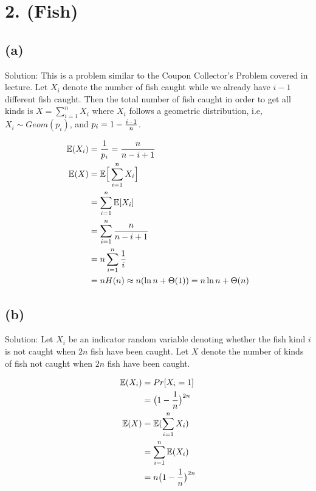 \documentclass[10pt]{537homework}
\author{Peilun Dai}
\begin{document}
\section*{2. (Fish) }


\subsection*{(a)} 

Solution: This is a problem similar to the Coupon Collector's Problem covered in lecture. Let $X_i$ denote the number of fish caught while we already have $i-1$ different fish caught. Then the total number of fish caught in order to get all kinds is $X = \sum_{i=1}^n X_i$ where $X_i$ follows a geometric distribution, i.e, $X_i \sim Geom(p_i)$, and $p_i = 1 - {i-1 \over n}$. 

\begin{align*}
  \mathbb{E}(X_i) & = {1 \over p_i} = {n \over n-i+1} \\
  \mathbb{E}(X)   & = \mathbb{E}\Big[ \sum_{i=1}^n  X_i \Big] \\
                  & = \sum_{i=1}^n \mathbb{E}[ X_i ] \\
                  & = \sum_{i=1}^n { n \over n - i + 1} \\
                  & = n \sum_{i=1}^n {1 \over i} \\
                  & = n H(n) \approx n(\ln{n} + \Theta(1)) = n\ln{n} + \Theta(n)
\end{align*}



\subsection*{(b)}

Solution: Let $X_i$ be an indicator random variable denoting whether the fish kind $i$ is not caught when $2n$ fish have been caught. Let $X$ denote the number of kinds of fish not caught when $2n$ fish have been caught. 

\begin{align*}
  \mathbb{E}(X_i)   & = Pr[X_i=1] \\
                    & = \big(1 - {1 \over n}\big)^{2n} \\
  \mathbb{E}(X)     & = \mathbb{E}(\sum_{i=1}^n X_i) \\
                    & = \sum_{i=1}^n \mathbb{E}(X_i) \\
                    & = n\big(1 - {1 \over n}\big)^{2n}
\end{align*}
\end{document}
